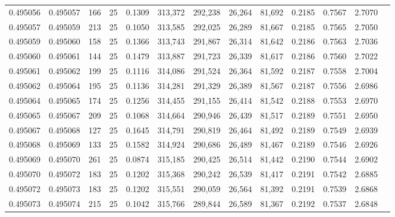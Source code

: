 \begin{tabular}{rrrrrrrrrrrrr}
0.495056 & 0.495057 &   166 &  25 &                                     0.1309 & 313,372 & 292,238 &  26,264 &  81,692 & 0.2185 & 0.7567 & 2.7070 \\
0.495057 & 0.495059 &   213 &  25 &                                     0.1050 & 313,585 & 292,025 &  26,289 &  81,667 & 0.2185 & 0.7565 & 2.7050 \\
0.495059 & 0.495060 &   158 &  25 &                                     0.1366 & 313,743 & 291,867 &  26,314 &  81,642 & 0.2186 & 0.7563 & 2.7036 \\
0.495060 & 0.495061 &   144 &  25 &                                     0.1479 & 313,887 & 291,723 &  26,339 &  81,617 & 0.2186 & 0.7560 & 2.7022 \\
0.495061 & 0.495062 &   199 &  25 &                                     0.1116 & 314,086 & 291,524 &  26,364 &  81,592 & 0.2187 & 0.7558 & 2.7004 \\
0.495062 & 0.495064 &   195 &  25 &                                     0.1136 & 314,281 & 291,329 &  26,389 &  81,567 & 0.2187 & 0.7556 & 2.6986 \\
0.495064 & 0.495065 &   174 &  25 &                                     0.1256 & 314,455 & 291,155 &  26,414 &  81,542 & 0.2188 & 0.7553 & 2.6970 \\
0.495065 & 0.495067 &   209 &  25 &                                     0.1068 & 314,664 & 290,946 &  26,439 &  81,517 & 0.2189 & 0.7551 & 2.6950 \\
0.495067 & 0.495068 &   127 &  25 &                                     0.1645 & 314,791 & 290,819 &  26,464 &  81,492 & 0.2189 & 0.7549 & 2.6939 \\
0.495068 & 0.495069 &   133 &  25 &                                     0.1582 & 314,924 & 290,686 &  26,489 &  81,467 & 0.2189 & 0.7546 & 2.6926 \\
0.495069 & 0.495070 &   261 &  25 &                                     0.0874 & 315,185 & 290,425 &  26,514 &  81,442 & 0.2190 & 0.7544 & 2.6902 \\
0.495070 & 0.495072 &   183 &  25 &                                     0.1202 & 315,368 & 290,242 &  26,539 &  81,417 & 0.2191 & 0.7542 & 2.6885 \\
0.495072 & 0.495073 &   183 &  25 &                                     0.1202 & 315,551 & 290,059 &  26,564 &  81,392 & 0.2191 & 0.7539 & 2.6868 \\
0.495073 & 0.495074 &   215 &  25 &                                     0.1042 & 315,766 & 289,844 &  26,589 &  81,367 & 0.2192 & 0.7537 & 2.6848 \\

\end{tabular}
